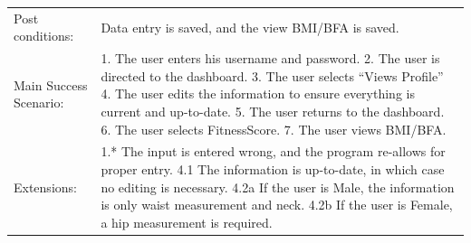 \documentclass[10pt]{article}
\begin{document}
\begin{longtable}[]{@{}ll@{}}
\begin{minipage}[t]{0.47\columnwidth}
Post conditions:\strut
\end{minipage} & \begin{minipage}[t]{0.47\columnwidth}\raggedright\strut
Data entry is saved, and the view BMI/BFA is saved.\strut
\end{minipage}\tabularnewline
\begin{minipage}[t]{0.48\columnwidth}\raggedright\strut
Main Success Scenario:\strut
\end{minipage} & \begin{minipage}[t]{0.48\columnwidth}\raggedright\strut
1.	The user enters his username and password.
2.	The user is directed to the dashboard.
3.	The user selects “Views Profile”
4.	The user edits the information to ensure everything is current and up-to-date.
5.	The user returns to the dashboard.
6.	The user selects FitnessScore.
7.	The user views BMI/BFA.
\strut
\end{minipage}\tabularnewline
\begin{minipage}[t]{0.48\columnwidth}\raggedright\strut
Extensions:\strut
\end{minipage} & \begin{minipage}[t]{0.48\columnwidth}\raggedright\strut
1.* The input is entered wrong, and the program re-allows for proper entry.
4.1 The information is up-to-date, in which case no editing is necessary.
4.2a If the user is Male, the information is only waist measurement and neck.
4.2b If the user is Female, a hip measurement is required.
\strut
\end{minipage}\tabularnewline
\bottomrule
\end{longtable}
\end{document}
